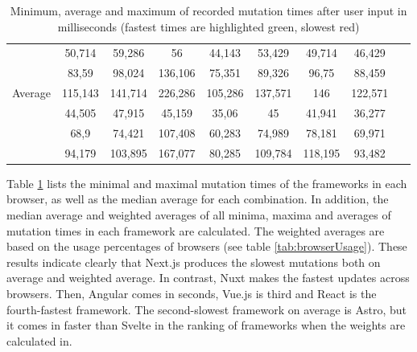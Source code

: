 \documentclass[a4paper, 10pt]{article}
\begin{document}
\begin{table}[!ht]
\begin{adjustbox}{angle=90}
{\begin{tabular}{|l|c|c|c|c|c|c|c|r|}
                 \hline
                                                     & 50,714  & 59,286                    & 56                        & 44,143                  & 53,429  & 49,714  & 46,429  & ~       \\
                                                     & 83,59   & 98,024                    & 136,106                   & 75,351                  & 89,326  & 96,75   & 88,459  & ~       \\
                 \multirow{-3}{*}{Average}           & 115,143 & 141,714                   & 226,286                   & 105,286                 & 137,571 & 146     & 122,571 & ~       \\ \hline
\rowcolor{white}                                     & 44,505  & 47,915                    & 45,159                    & 35,06                   & 45      & 41,941  & 36,277  & ~       \\
\rowcolor{white}                                     & 68,9    & 74,421                    & 107,408                   & 60,283                  & 74,989  & 78,181  & 69,971  & ~       \\
\rowcolor{white} \multirow{-3}{*}{Weighted average}  & 94,179  & 103,895                   & 167,077                   & 80,285                  & 109,784 & 118,195 & 93,482  & ~       \\ \hline
      \end{tabular}
    }
  \end{adjustbox}
  \caption{Minimum, average and maximum of recorded mutation times after user input in milliseconds (fastest times are highlighted green, slowest red)}
  \label{tab:mutations:times}
\end{table}

Table \ref{tab:mutations:times} lists the minimal and maximal mutation times of the frameworks in each browser, as well as the median average for each combination.
In addition, the median average and weighted averages of all minima, maxima and averages of mutation times in each framework are calculated.
The weighted averages are based on the usage percentages of browsers (see table \ref{tab:browserUsage}).
These results indicate clearly that Next.js produces the slowest mutations both on average and weighted average.
In contrast, Nuxt makes the fastest updates across browsers.
Then, Angular comes in seconds, Vue.js is third and React is the fourth-fastest framework.
The second-slowest framework on average is Astro, but it comes in faster than Svelte in the ranking of frameworks when the weights are calculated in.
\end{document}
